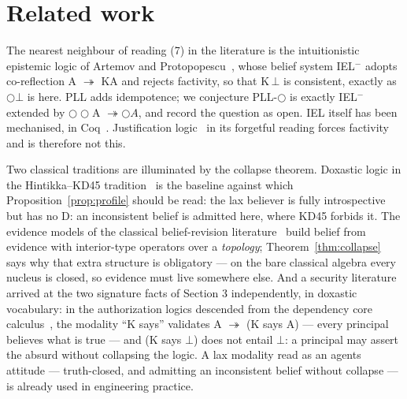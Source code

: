 \section{Related work}\label{8-related-work}

The nearest neighbour of reading (7) in the literature is the
intuitionistic epistemic logic of Artemov and Protopopescu~\cite{ArtemovProtopopescu2016}, whose
belief system IEL\ensuremath{{}^{-}} adopts co-reflection A \ensuremath{\twoheadrightarrow} KA and rejects factivity,
so that K\,\ensuremath{\bot} is consistent, exactly as \ensuremath{\bigcirc\bot} is here. PLL
adds idempotence; we conjecture PLL-\ensuremath{\bigcirc} is exactly IEL\ensuremath{{}^{-}} extended by
\ensuremath{\bigcirc\bigcirc}A \ensuremath{\twoheadrightarrow \bigcirc A}, and record the question as open. IEL itself has
been mechanised, in Coq~\cite{HagemeierKirst2022}. Justification
logic~\cite{Artemov2001,Artemov2008,ArtemovFitting2019} in its
forgetful reading forces factivity and is therefore not this.

Two classical traditions are illuminated by the collapse theorem.
Doxastic logic in the Hintikka--KD45
tradition~\cite{Hintikka1962,FaginHalpernMosesVardi1995,Stalnaker2006}
is the
baseline against which Proposition~\ref{prop:profile} should be read:
the lax believer is fully introspective but has no D: an
inconsistent belief is admitted here, where KD45 forbids it. The evidence
models of the classical belief-revision
literature~\cite{VanBenthemPacuit2011,BaltagBezhanishviliOzgunSmets2016,
BaltagBezhanishviliOzgunSmets2022}
build belief from evidence with interior-type operators over a
\emph{topology}; Theorem~\ref{thm:collapse} says why that extra
structure is obligatory --- on the bare classical algebra every nucleus
is closed, so evidence must live somewhere else. And a security
literature arrived at the two signature facts of Section 3
independently, in doxastic vocabulary: in the authorization logics
descended from the dependency core
calculus~\cite{Abadi2006,GargAbadi2008}, the modality ``K says''
validates A \ensuremath{\twoheadrightarrow} (K says A) --- every principal believes what is
true --- and (K says \ensuremath{\bot}) does not entail \ensuremath{\bot}: a principal may
assert the absurd without collapsing the logic. A lax modality read as
an agent\textquotesingle s attitude --- truth-closed, and admitting an inconsistent
belief without collapse --- is already used in engineering practice.

